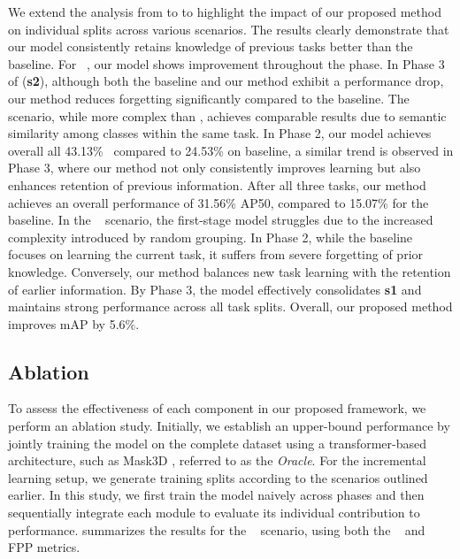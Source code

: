 
We extend the analysis from  to  to highlight the impact of our proposed method on individual splits across various scenarios. The results clearly demonstrate that our model consistently retains knowledge of previous tasks better than the baseline. For \fsplit~, our model shows improvement throughout the phase. In Phase 3 of (\textbf{s2}), although both the baseline and our method exhibit a performance drop, our method reduces forgetting significantly compared to the baseline.
The \ssplit~ scenario, while more complex than \fsplit, achieves comparable results due to semantic similarity among classes within the same task. In Phase 2, our model achieves overall all 43.13\% \mapft~compared to 24.53\% on baseline, a similar trend is observed in Phase 3, where our method not only consistently improves learning but also enhances retention of previous information. After all three tasks, our method achieves an overall performance of 31.56\% AP50, compared to 15.07\% for the baseline.
% 
In the \rsplit~ scenario, the first-stage model struggles due to the increased complexity introduced by random grouping. In Phase 2, while the baseline focuses on learning the current task, it suffers from severe forgetting of prior knowledge. Conversely, our method balances new task learning with the retention of earlier information. By Phase 3, the model effectively consolidates \textbf{s1} and maintains strong performance across all task splits. Overall, our proposed method improves mAP by 5.6\%.


\subsection{Ablation}

To assess the effectiveness of each component in our proposed framework, we perform an ablation study. Initially, we establish an upper-bound performance by jointly training the model on the complete dataset using a transformer-based architecture, such as Mask3D \cite{Schult23ICRA}, referred to as the \textit{Oracle}. For the incremental learning setup, we generate training splits according to the scenarios outlined earlier. In this study, we first train the model naively across phases and then sequentially integrate each module to evaluate its individual contribution to performance.  summarizes the results for the \fsplit~ scenario, using both the \mapft~ and FPP metrics.

